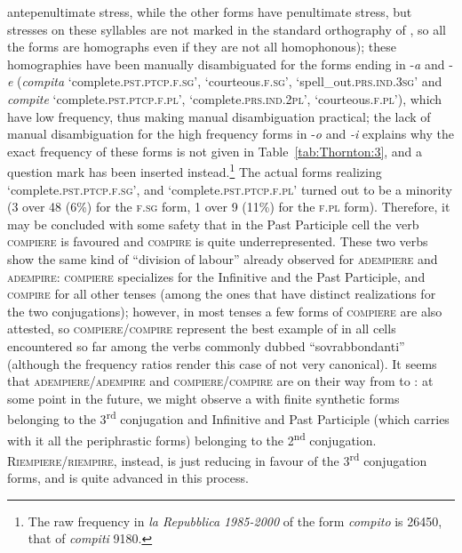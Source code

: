 \documentclass[output=paper]{langsci/langscibook}
\begin{document}
antepenultimate stress, while the other forms have penultimate stress,
but stresses on these syllables are not marked in the standard
orthography of , so all the forms are homographs even if they are
not all homophonous); these homographies have been manually
disambiguated for the forms ending in -\emph{a} and -\emph{e}
(\emph{compita} `complete.\textsc{pst.ptcp.f.sg}',
`courteous\textsc{.f.sg}', `spell\_out.\textsc{prs.ind.3sg}' and
\emph{compite} `complete.\textsc{pst.ptcp.f.pl}',
`complete.\textsc{prs.ind.2pl}', `courteous\textsc{.f.pl}'), which have
low frequency, thus making manual disambiguation practical; the lack of
manual disambiguation for the high frequency forms in -\emph{o} and
\emph{-i} explains why the exact frequency of these forms is not given
in Table~\ref{tab:Thornton:3}, and a question mark has been inserted instead.\footnote{The
  raw frequency in \emph{la Repubblica} \emph{1985-2000} of the form
  \emph{compito} is 26450, that of \emph{compiti} 9180.} The actual
forms realizing `complete.\textsc{pst.ptcp.f.sg}', and
`complete.\textsc{pst.ptcp.f.pl}' turned out to be a minority (3 over 48
(6\%) for the \textsc{f.sg} form, 1 over 9 (11\%) for the \textsc{f.pl}
form). Therefore, it may be concluded with some safety that in the Past
Participle cell the verb \textsc{compiere} is favoured and
\textsc{compire} is quite underrepresented. These two verbs show the
same kind of ``division of labour'' already observed for
\textsc{adempiere} and \textsc{adempire}: \textsc{compiere} specializes
for the Infinitive and the Past Participle, and \textsc{compire} for all
other tenses (among the ones that have distinct realizations for the two
conjugations); however, in most tenses a few forms of \textsc{compiere}
are also attested, so \textsc{compiere\slash{}compire} represent the best
example of  in all cells encountered so far among the
 verbs commonly dubbed ``sovrabbondanti'' (although the frequency
ratios render this case of  not very canonical). It seems
that \textsc{adempiere\slash{}adempire} and \textsc{compiere\slash{}compire} are
on their way from  to : at some point in the
future, we might observe a  with finite synthetic forms belonging
to the 3\textsuperscript{rd} conjugation and Infinitive and Past
Participle (which carries with it all the periphrastic forms) belonging
to the 2\textsuperscript{nd} conjugation. \textsc{Riempiere\slash{}riempire},
instead, is just reducing  in favour of the
3\textsuperscript{rd} conjugation forms, and is quite advanced in this
process.
\end{document}
